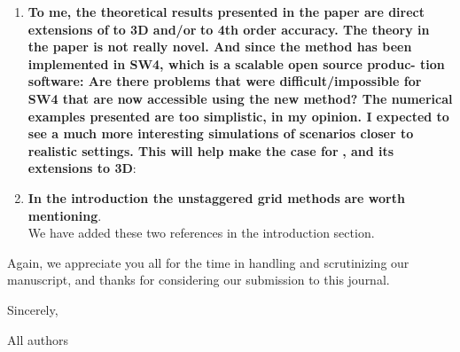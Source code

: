 \documentclass[twoside,11pt]{article}
\begin{document}
\begin{enumerate}
\item  \textbf{To me, the theoretical results presented in the paper are direct extensions of} \cite{wang2019fourth} \textbf{to 3D and/or} \cite{petersson2009stable} \textbf{to 4th order accuracy. The theory in the paper is not really novel. And since the method has been implemented in SW4, which is a scalable open source produc- tion software: Are there problems that were difficult/impossible for SW4 that are now accessible using the new method? The numerical examples presented are too simplistic, in my opinion. I expected to see a much more interesting simulations of scenarios closer to realistic settings. This will help make the case for} \cite{wang2019fourth}\textbf{, and its extensions to 3D}: 

\item \textbf{In the introduction the unstaggered grid methods} \cite{kozdon2013simulation,duru2016dynamic} \textbf{are worth mentioning}.\\
We have added these two references in the introduction section.

\end{enumerate}

Again, we appreciate you all for the time in handling and scrutinizing our manuscript, and thanks for considering our submission to this journal.

Sincerely, 

All authors



\end{document}
